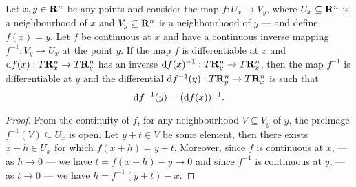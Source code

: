\begin{theorem}
  Let \(x, y \in \mathbf{R}^n\) be any points and consider the map \(f: U_x \to V_y\),
  where \(U_x \subseteq \mathbf{R}^n\) is a neighbourhood of \(x\) and \(V_y \subseteq
  \mathbf{R}^n\) is a neighbourhood of \(y\) --- and define \(f(x) = y\). Let \(f\) be
  continuous at \(x\) and have a continuous inverse mapping \(f^{-1}: V_y \to
  U_x\) at the point \(y\). If the map \(f\) is differentiable at \(x\) and
  \(\mathrm{d} f(x): T\mathbf{R}^n_x \to T\mathbf{R}^n_y\) has an inverse \(\mathrm{d} f(x)^{-1}: T\mathbf{R}^n_y
  \to T\mathbf{R}^n_x\), then the map \(f^{-1}\) is differentiable at \(y\) and the
  differential \(\mathrm{d} f^{-1}(y): T\mathbf{R}^n_y \to T\mathbf{R}^n_x\) is such that
  \[
    \mathrm{d} f^{-1}(y) = (\mathrm{d} f(x))^{-1}.
  \]
\end{theorem}

\begin{proof}
  From the continuity of \(f\), for any neighbourhood \(V \subseteq V_y\) of
  \(y\), the preimage \(f^{-1}(V) \subseteq U_x\) is open. Let \(y + t \in V\)
  be some element, then there exists \(x + h \in U_x\) for which \(f(x + h) = y
  + t\). Moreover, since \(f\) is continuous at \(x\), --- as \(h \to 0\) --- we
  have \(t = f(x + h) - y \to 0\) and since \(f^{-1}\) is continuous at \(y\),
  --- as \(t \to 0\) --- we have \(h = f^{-1}(y + t) - x\).


\end{proof}
